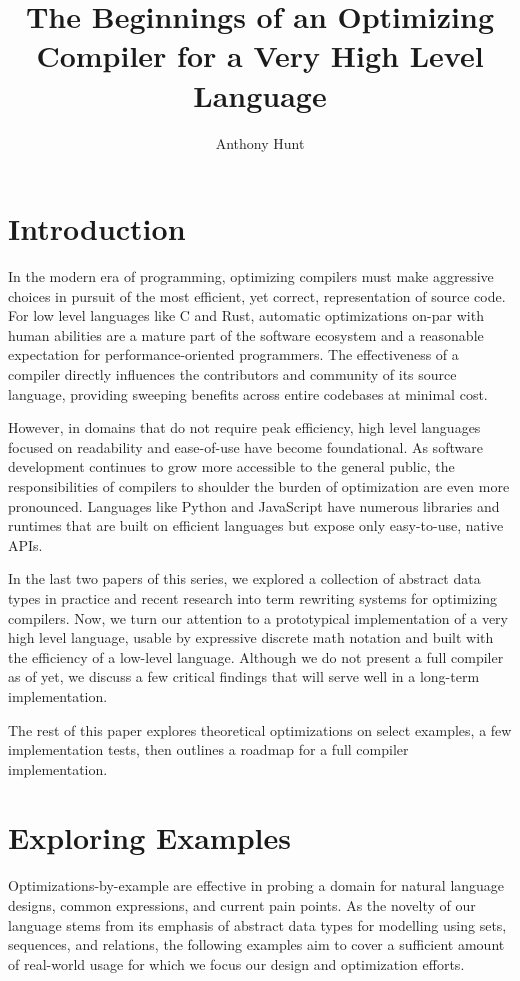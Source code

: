 \documentclass{article}
\title{The Beginnings of an Optimizing Compiler for a Very High Level Language}
\author{Anthony Hunt}
\begin{document}
\maketitle
\tableofcontents
\newpage

\section{Introduction}

In the modern era of programming, optimizing compilers must make aggressive choices in pursuit of the most efficient, yet correct, representation of source code. For low level languages like C and Rust, automatic optimizations on-par with human abilities are a mature part of the software ecosystem and a reasonable expectation for performance-oriented programmers. The effectiveness of a compiler directly influences the contributors and community of its source language, providing sweeping benefits across entire codebases at minimal cost.

However, in domains that do not require peak efficiency, high level languages focused on readability and ease-of-use have become foundational. As software development continues to grow more accessible to the general public, the responsibilities of compilers to shoulder the burden of optimization are even more pronounced. Languages like Python and JavaScript have numerous libraries and runtimes that are built on efficient languages but expose only easy-to-use, native APIs.

In the last two papers of this series, we explored a collection of abstract data types in practice and recent research into term rewriting systems for optimizing compilers. Now, we turn our attention to a prototypical implementation of a very high level language, usable by expressive discrete math notation and built with the efficiency of a low-level language. Although we do not present a full compiler as of yet, we discuss a few critical findings that will serve well in a long-term implementation.

The rest of this paper explores theoretical optimizations on select examples, a few implementation tests, then outlines a roadmap for a full compiler implementation.

\section{Exploring Examples}

Optimizations-by-example are effective in probing a domain for natural language designs, common expressions, and current pain points. As the novelty of our language stems from its emphasis of abstract data types for modelling using sets, sequences, and relations, the following examples aim to cover a sufficient amount of real-world usage for which we focus our design and optimization efforts.
\end{document}

